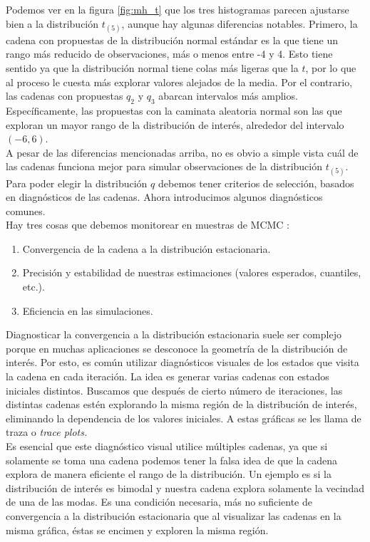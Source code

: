 \documentclass[11pt,a4paper]{article}
\begin{document}
Podemos ver en la figura \ref{fig:mh_t} que los tres histogramas parecen ajustarse bien a la distribución $t_{(5)}$, aunque hay algunas diferencias notables. Primero, la cadena con propuestas de la distribución normal estándar es la que tiene un rango más reducido de observaciones, más o menos entre -4 y 4. Esto tiene sentido ya que la distribución normal tiene colas más ligeras que la $t$, por lo que al proceso le cuesta más explorar valores alejados de la media. Por el contrario, las cadenas con propuestas $q_2$ y $q_3$ abarcan intervalos más amplios. Específicamente, las propuestas con la caminata aleatoria normal son las que exploran un mayor rango de la distribución de interés, alrededor del intervalo $(-6, 6)$.\\

A pesar de las diferencias mencionadas arriba, no es obvio a simple vista cuál de las cadenas funciona mejor para simular observaciones de la distribución $t_{(5)}$. Para poder elegir la distribución $q$ debemos tener criterios de selección, basados en diagnósticos de las cadenas. Ahora introducimos algunos diagnósticos comunes.\\

Hay tres cosas que debemos monitorear en muestras de MCMC \citep{kruschke}:
\begin{enumerate}
\item Convergencia de la cadena a la distribución estacionaria.\\
\item Precisión y estabilidad de nuestras estimaciones (valores esperados, cuantiles, etc.).
\item Eficiencia en las simulaciones.\\
\end{enumerate}

Diagnosticar la convergencia a la distribución estacionaria suele ser complejo porque en muchas aplicaciones se desconoce la geometría de la distribución de interés. Por esto, es común utilizar diagnósticos visuales de los estados que visita la cadena en cada iteración. La idea es generar varias cadenas con estados iniciales distintos. Buscamos que después de cierto número de iteraciones, las distintas cadenas estén explorando la misma región de la distribución de interés, eliminando la dependencia de los valores iniciales. A estas gráficas se les llama de traza o \textit{trace plots.}\\

Es esencial que este diagnóstico visual utilice múltiples cadenas, ya que si solamente se toma una cadena podemos tener la falsa idea de que la cadena explora de manera eficiente el rango de la distribución. Un ejemplo es si la distribución de interés es bimodal y nuestra cadena explora solamente la vecindad de una de las modas. Es una condición necesaria, más no suficiente de convergencia a la distribución estacionaria que al visualizar las cadenas en la misma gráfica, éstas se encimen y exploren la misma región.\\
\end{document}
